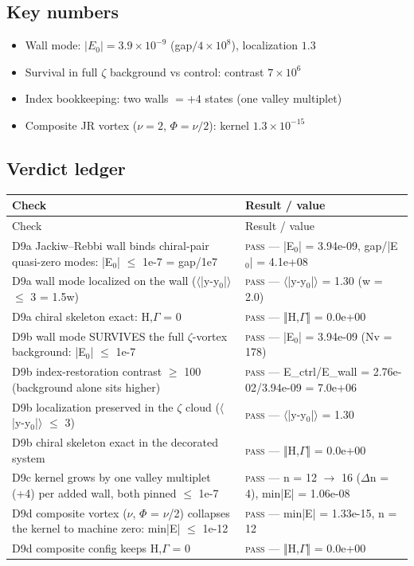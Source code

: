 \documentclass[11pt,a4paper]{article}
\begin{document}
\subsection{Key numbers}
\begin{tcolorbox}[colback=labblue!6, colframe=labblue!70!black, boxrule=0.6pt, title={Key results (canonical run)}]
\begin{itemize}[leftmargin=1.2em, itemsep=0.15em]
\item Wall mode: $|E_0| = 3.9\times10^{-9}$ (gap$/4\times10^{8}$), localization $1.3$
\item Survival in full $\zeta$ background vs control: contrast $7\times10^{6}$
\item Index bookkeeping: two walls $= +4$ states (one valley multiplet)
\item Composite JR vortex ($\nu=2$, $\Phi=\nu/2$): kernel $1.3\times10^{-15}$
\end{itemize}
\end{tcolorbox}

\subsection{Verdict ledger}
\begin{longtable}{@{}p{}p{}@{}}
\toprule
Check & Result / value \\
\midrule
\endfirsthead
\toprule
Check & Result / value \\
\midrule
\endhead
\bottomrule
\endfoot
D9a Jackiw--Rebbi wall binds chiral-pair quasi-zero modes: |E$_{0}$| $\le$ 1e-7 = gap/1e7 & \textsc{pass} --- |E$_{0}$| = 3.94e-09, gap/|E$_{0}$| = 4.1e+08 \\
D9a wall mode localized on the wall ($\langle$|y-y$_{0}$|$\rangle$ $\le$ 3 = 1.5w) & \textsc{pass} --- $\langle$|y-y$_{0}$|$\rangle$ = 1.30 (w = 2.0) \\
D9a chiral skeleton exact: {H,$\Gamma$} = 0 & \textsc{pass} --- ‖{H,$\Gamma$}‖ = 0.0e+00 \\
D9b wall mode SURVIVES the full $\zeta$-vortex background: |E$_{0}$| $\le$ 1e-7 & \textsc{pass} --- |E$_{0}$| = 3.94e-09 (Nv = 178) \\
D9b index-restoration contrast $\ge$ 100 (background alone sits higher) & \textsc{pass} --- E\_ctrl/E\_wall = 2.76e-02/3.94e-09 = 7.0e+06 \\
D9b localization preserved in the $\zeta$ cloud ($\langle$|y-y$_{0}$|$\rangle$ $\le$ 3) & \textsc{pass} --- $\langle$|y-y$_{0}$|$\rangle$ = 1.30 \\
D9b chiral skeleton exact in the decorated system & \textsc{pass} --- ‖{H,$\Gamma$}‖ = 0.0e+00 \\
D9c kernel grows by one valley multiplet (+4) per added wall, both pinned $\le$ 1e-7 & \textsc{pass} --- n = 12 $\to$ 16 ($\Delta$n = 4), min|E| = 1.06e-08 \\
D9d composite vortex ($\nu$, $\Phi$ = $\nu$/2) collapses the kernel to machine zero: min|E| $\le$ 1e-12 & \textsc{pass} --- min|E| = 1.33e-15, n = 12 \\
D9d composite config keeps {H,$\Gamma$} = 0 & \textsc{pass} --- ‖{H,$\Gamma$}‖ = 0.0e+00 \\
\end{longtable}
\end{document}
